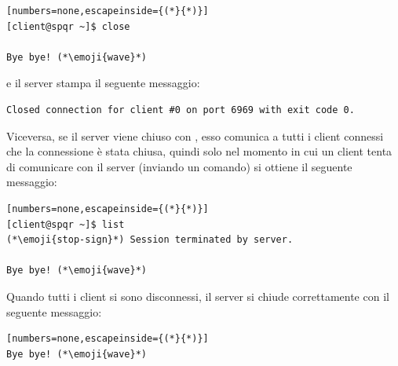 \begin{lstlisting}[numbers=none,escapeinside={(*}{*)}]
[client@spqr ~]$ close

Bye bye! (*\emoji{wave}*)
\end{lstlisting}

e il server stampa il seguente messaggio:

\begin{lstlisting}[numbers=none]
Closed connection for client #0 on port 6969 with exit code 0.
\end{lstlisting}

Viceversa, se il server viene chiuso con , esso comunica a tutti i client connessi che la connessione è stata chiusa, quindi solo nel momento in cui un client tenta di comunicare con il server (inviando un comando) si ottiene il seguente messaggio:

\begin{lstlisting}[numbers=none,escapeinside={(*}{*)}]
[client@spqr ~]$ list
(*\emoji{stop-sign}*) Session terminated by server.

Bye bye! (*\emoji{wave}*)
\end{lstlisting}

Quando tutti i client si sono disconnessi, il server si chiude correttamente con il seguente messaggio:

\begin{lstlisting}[numbers=none,escapeinside={(*}{*)}]
Bye bye! (*\emoji{wave}*)
\end{lstlisting}
